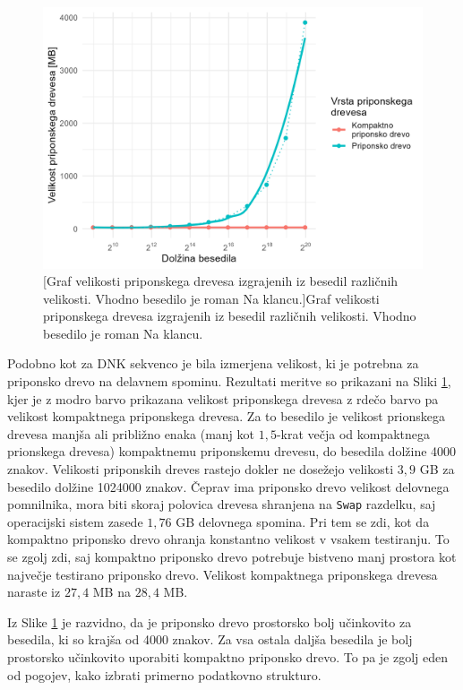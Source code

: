 \begin{figure}[htb]
    \includegraphics[width=\textwidth]{Slike/velikostDrecvesaNovPCSLO.png}
    [Graf velikosti priponskega drevesa izgrajenih iz besedil različnih velikosti. Vhodno besedilo je roman Na klancu.]{Graf velikosti priponskega drevesa izgrajenih iz besedil različnih velikosti. Vhodno besedilo je roman Na klancu.} 
    \label{fig:VelikostGrafSLO}
\end{figure}

Podobno kot za DNK sekvenco je bila izmerjena velikost, ki je potrebna za priponsko drevo na delavnem spominu. Rezultati meritve so prikazani na Sliki \ref{fig:VelikostGrafSLO}, kjer je z modro barvo prikazana velikost priponskega drevesa z rdečo barvo pa velikost kompaktnega priponskega drevesa. Za to besedilo je velikost prionskega drevesa manjša ali približno enaka (manj kot $1,5$-krat večja od kompaktnega prionskega drevesa) kompaktnemu priponskemu drevesu, do besedila dolžine 4000 znakov. Velikosti priponskih dreves rastejo dokler ne dosežejo velikosti $3,9$ GB za besedilo dolžine 1024000 znakov. Čeprav ima priponsko drevo velikost delovnega pomnilnika, mora biti skoraj polovica drevesa shranjena na \verb|Swap| razdelku, saj operacijski sistem zasede $1,76$ GB delovnega spomina. Pri tem se zdi, kot da kompaktno priponsko drevo ohranja konstantno velikost v vsakem testiranju. To se zgolj zdi, saj kompaktno priponsko drevo potrebuje bistveno manj prostora kot največje testirano priponsko drevo. Velikost kompaktnega priponskega drevesa naraste iz $27,4$ MB na $28,4$ MB.

Iz Slike \ref{fig:VelikostGrafSLO} je razvidno, da je priponsko drevo prostorsko bolj učinkovito za besedila, ki so krajša od 4000 znakov. Za vsa ostala daljša besedila je bolj prostorsko učinkovito uporabiti kompaktno priponsko drevo. To pa je zgolj eden od pogojev, kako izbrati primerno podatkovno strukturo.


